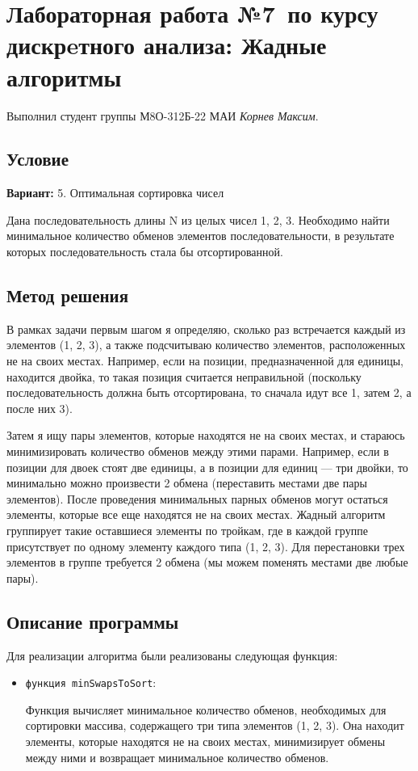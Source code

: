 \documentclass[12pt]{article}
\begin{document}
\section*{Лабораторная работа №7\, по курсу дискрeтного анализа: Жадные алгоритмы}

Выполнил студент группы М8О-312Б-22 МАИ \textit{Корнев Максим}.

\subsection*{Условие}
\textbf{Вариант:} 5. Оптимальная сортировка чисел

Дана последовательность длины N из целых чисел 1, 2, 3. Необходимо найти минимальное количество обменов элементов последовательности, в результате которых последовательность стала бы отсортированной. 


\newpage
\subsection*{Метод решения}

В рамках задачи первым шагом я определяю, сколько раз встречается каждый из элементов (1, 2, 3), а также подсчитываю количество элементов, расположенных не на своих местах. Например, если на позиции, предназначенной для единицы, находится двойка, то такая позиция считается неправильной (поскольку последовательность должна быть отсортирована, то сначала идут все 1, затем 2, а после них 3).

Затем я ищу пары элементов, которые находятся не на своих местах, и стараюсь минимизировать количество обменов между этими парами. Например, если в позиции для двоек стоят две единицы, а в позиции для единиц — три двойки, то минимально можно произвести 2 обмена (переставить местами две пары элементов). После проведения минимальных парных обменов могут остаться элементы, которые все еще находятся не на своих местах. Жадный алгоритм группирует такие оставшиеся элементы по тройкам, где в каждой группе присутствует по одному элементу каждого типа (1, 2, 3). Для перестановки трех элементов в группе требуется 2 обмена (мы можем поменять местами две любые пары).

\subsection*{Описание программы}

Для реализации алгоритма были реализованы следующая функция:
\begin{itemize}
    \item \texttt{функция minSwapsToSort}: 
    
    Функция вычисляет минимальное количество обменов, необходимых для сортировки массива, содержащего три типа элементов (1, 2, 3). Она находит элементы, которые находятся не на своих местах, минимизирует обмены между ними и возвращает минимальное количество обменов.

\end{itemize}
\end{document}
